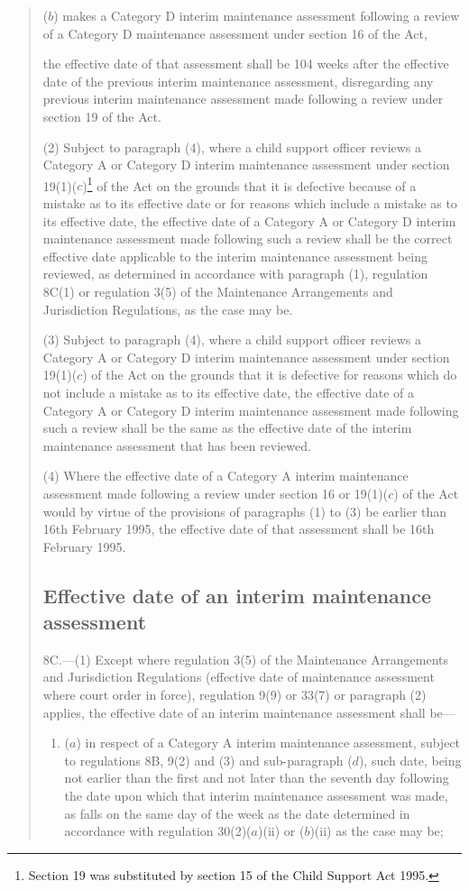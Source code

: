 \documentclass[a4paper]{article}
\begin{document}
\begin{quotation}
\begin{enumerate}
($b$) makes a Category D interim maintenance assessment following a review of a Category D maintenance assessment under section 16 of the Act,
\end{enumerate}
the effective date of that assessment shall be 104 weeks after the effective date of the previous interim maintenance assessment, disregarding any previous interim maintenance assessment made following a review under section 19 of the Act.

(2) Subject to paragraph (4), where a child support officer reviews a Category A or Category D interim maintenance assessment under section 19(1)($c$)\footnote{\frenchspacing Section 19 was substituted by section 15 of the Child Support Act 1995.} of the Act on the grounds that it is defective because of a mistake as to its effective date or for reasons which include a mistake as to its effective date, the effective date of a Category A or Category D interim maintenance assessment made following such a review shall be the correct effective date applicable to the interim maintenance assessment being reviewed, as determined in accordance with paragraph (1), regulation 8C(1) or regulation 3(5) of the Maintenance Arrangements and Jurisdiction Regulations, as the case may be.

(3) Subject to paragraph (4), where a child support officer reviews a Category A or Category D interim maintenance assessment under section 19(1)($c$) of the Act on the grounds that it is defective for reasons which do not include a mistake as to its effective date, the effective date of a Category A or Category D interim maintenance assessment made following such a review shall be the same as the effective date of the interim maintenance assessment that has been reviewed.

(4) Where the effective date of a Category A interim maintenance assessment made following a review under section 16 or 19(1)($c$) of the Act would by virtue of the provisions of paragraphs (1) to (3) be earlier than 16th February 1995, the effective date of that assessment shall be 16th February 1995.

\subsection*{Effective date of an interim maintenance assessment}

8C.—(1) Except where regulation 3(5) of the Maintenance Arrangements and Jurisdiction Regulations (effective date of maintenance assessment where court order in force), regulation 9(9) or 33(7) or paragraph (2) applies, the effective date of an interim maintenance assessment shall be—
\begin{enumerate}\item[]
($a$) in respect of a Category A interim maintenance assessment, subject to regulations 8B, 9(2) and (3) and sub-paragraph ($d$), such date, being not earlier than the first and not later than the seventh day following the date upon which that interim maintenance assessment was made, as falls on the same day of the week as the date determined in accordance with regulation 30(2)($a$)(ii) or ($b$)(ii) as the case may be;


\end{enumerate}
\end{quotation}
\end{document}
